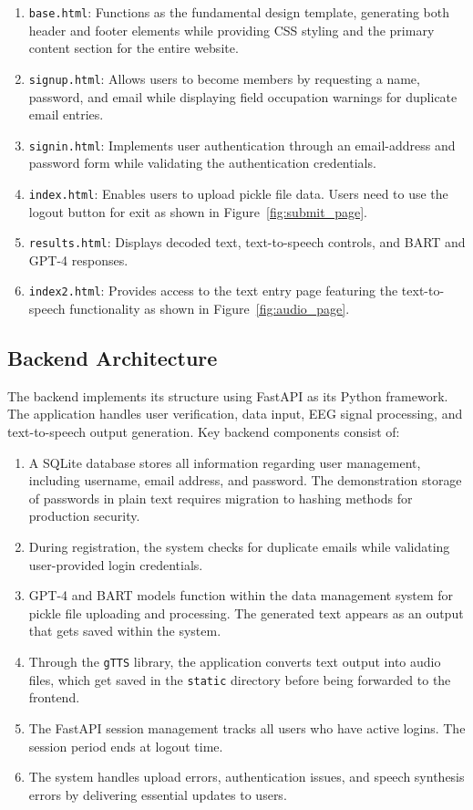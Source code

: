 \documentclass[journal]{IEEEtran}
\begin{document}
\begin{enumerate}
	\item \texttt{base.html}: Functions as the fundamental design template, generating both header and footer elements while providing CSS styling and the primary content section for the entire website.
	\item \texttt{signup.html}: Allows users to become members by requesting a name, password, and email while displaying field occupation warnings for duplicate email entries.
	\item \texttt{signin.html}: Implements user authentication through an email-address and password form while validating the authentication credentials.
	\item \texttt{index.html}: Enables users to upload pickle file data. Users need to use the logout button for exit as shown in Figure~\ref{fig:submit_page}.
	\item \texttt{results.html}: Displays decoded text, text-to-speech controls, and BART and GPT-4 responses.
	\item \texttt{index2.html}: Provides access to the text entry page featuring the text-to-speech functionality as shown in Figure~\ref{fig:audio_page}.
\end{enumerate}

\subsection{Backend Architecture}
The backend implements its structure using FastAPI as its Python framework. The application handles user verification, data input, EEG signal processing, and text-to-speech output generation. Key backend components consist of:

\begin{enumerate}
	\item A SQLite database stores all information regarding user management, including username, email address, and password. The demonstration storage of passwords in plain text requires migration to hashing methods for production security.
	\item During registration, the system checks for duplicate emails while validating user-provided login credentials.
	\item GPT-4 and BART models function within the data management system for pickle file uploading and processing. The generated text appears as an output that gets saved within the system.
	\item Through the \texttt{gTTS} library, the application converts text output into audio files, which get saved in the \texttt{static} directory before being forwarded to the frontend.
	\item The FastAPI session management tracks all users who have active logins. The session period ends at logout time.
	\item The system handles upload errors, authentication issues, and speech synthesis errors by delivering essential updates to users.
\end{enumerate}
\end{document}
